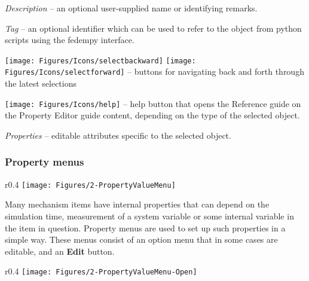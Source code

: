\begin{bulletlist}
\item{\sl Description} --
  an optional user-supplied name or identifying remarks.
\item{\sl Tag} --
  an optional identifier which can be used to refer to the object from
  python scripts using the fedempy interface.
\item\texttt{[image: Figures/Icons/selectbackward]}
  \texttt{[image: Figures/Icons/selectforward]} --
  buttons for navigating back and forth through the latest selections
\item\texttt{[image: Figures/Icons/help]} --
  help button that opens the Reference guide on the Property Editor guide
  content, depending on the type of the selected object.
\item{\sl Properties} --
  editable attributes specific to the selected object.
\end{bulletlist}




\subsubsection{Property menus}

\begin{wrapfigure}{r}{0.4\textwidth}
  \texttt{[image: Figures/2-PropertyValueMenu]}
\end{wrapfigure}

Many mechanism items have internal properties that can depend on the
simulation time, measurement of a system variable or some internal
variable in the item in question. Property menus are used to
set up such properties in a simple way. These menus consist of
an option menu that in some cases are editable, and an \textbf{Edit} button.

\begin{wrapfigure}{r}{0.4\textwidth}
  \texttt{[image: Figures/2-PropertyValueMenu-Open]}
\end{wrapfigure}

